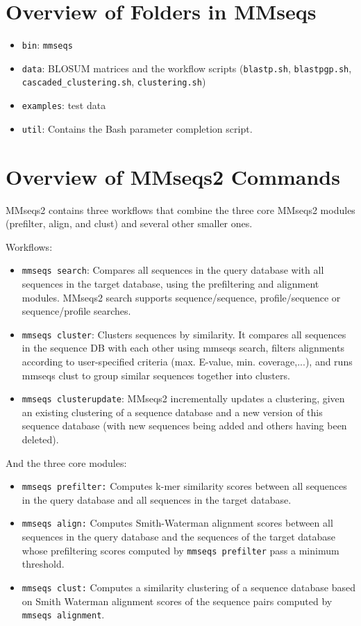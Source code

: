 \documentclass[11pt,a4paper]{scrreprt}
\begin{document}
\section{Overview of Folders in MMseqs}
\begin{itemize}
\item \texttt{bin}: \texttt{mmseqs}
\item \texttt{data}: BLOSUM matrices and the workflow scripts (\texttt{blastp.sh}, \texttt{blastpgp.sh}, \texttt{cascaded\_clustering.sh}, \texttt{clustering.sh})
\item \texttt{examples}: test data 
\item \texttt{util}: Contains the Bash parameter completion script.
\end{itemize}

\section{Overview of MMseqs2 Commands}
MMseqs2 contains three workflows that combine the three core MMseqs2 modules (prefilter, align, and clust) and several other smaller ones. 

Workflows:
\begin{itemize}
\item \texttt{mmseqs search}: Compares all sequences in the query database with all sequences in the target database, using the prefiltering and alignment modules. MMseqs2 search supports sequence/sequence, profile/sequence or sequence/profile searches.
\item \texttt{mmseqs cluster}:  Clusters sequences by similarity. It compares all sequences in the sequence DB with each other using mmseqs search, filters alignments according to user-specified criteria (max. E-value, min. coverage,...),   and runs mmseqs clust to group similar sequences together into clusters.
\item \texttt{mmseqs clusterupdate}: MMseqs2 incrementally updates a clustering, given an existing clustering of a sequence database and a new version of this sequence database (with new sequences being added and others having been deleted).
\end{itemize}

And the three core modules:
\begin{itemize}
\item \texttt{mmseqs prefilter:} Computes k-mer similarity scores between all sequences in the query database and all sequences in the target database.
\item \texttt{mmseqs align:} Computes Smith-Waterman alignment scores between all sequences in the query database and the sequences of the target database whose prefiltering scores computed by \texttt{mmseqs prefilter} pass a minimum threshold.
\item \texttt{mmseqs clust:} Computes a similarity clustering of a sequence database based on Smith Waterman alignment scores of the sequence pairs computed by \texttt{mmseqs alignment}.
\end{itemize}
\end{document}

